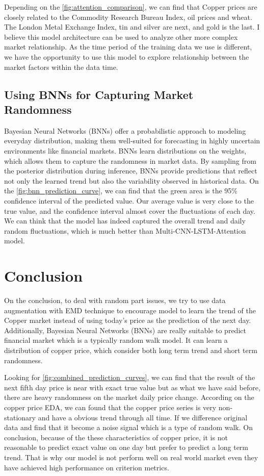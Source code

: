 \documentclass[final-report]{report-template}
\begin{document}
Depending on the \autoref{fig:attention_comparison}, we can find that Copper prices are closely related to the Commodity Research Bureau Index, oil prices and wheat. The London Metal Exchange Index, tin and silver are next, and gold is the last. I believe this model architecture can be used to analyze other more complex market relationship. As the time period of the training data we use is different, we have the opportunity to use this model to explore relationship between the market factors within the data time.

\subsection{Using BNNs for Capturing Market Randomness}
Bayesian Neural Networks (BNNs) offer a probabilistic approach to modeling everyday distribution, making them well-suited for forecasting in highly uncertain environments like financial markets. BNNs learn distributions on the weights, which allows them to capture the randomness in market data. By sampling from the posterior distribution during inference, BNNs provide predictions that reflect not only the learned trend but also the variability observed in historical data. On the \autoref{fig:bnn_prediction_curve}, we can find that the green area is the 95\% confidence interval of the predicted value. Our average value is very close to the true value, and the confidence interval almost cover the fluctuations of each day. We can think that the model has indeed captured the overall trend and daily random fluctuations, which is much better than Multi-CNN-LSTM-Attention model.

\section{Conclusion}

On the conclusion, to deal with random part issues, we try to use data augmentation with EMD technique to encourage model to learn the trend of the Copper market instead of using today's price as the prediction of the next day. Additionally, Bayesian Neural Networks (BNNs) are really suitable to predict financial market which is a typically random walk model.  It can learn a distribution of copper price, which consider both long term trend and short term randomness.

Looking for \autoref{fig:combined_prediction_curves}, we can find that the result of the next fifth day price is near with exact true value but as what we have said before, there are heavy randomness on the market daily price change. According on the copper price EDA, we can found that the copper price series is very non-stationary and have a obvious trend through all time. If we difference original data and find that it become a noise signal which is a type of random walk. On conclusion, because of the these characteristics of copper price, it is not reasonable to predict exact value on one day but prefer to predict a long term trend. That is why our model is not perform well on real world market even they have achieved high performance on criterion metrics.   
\end{document}
